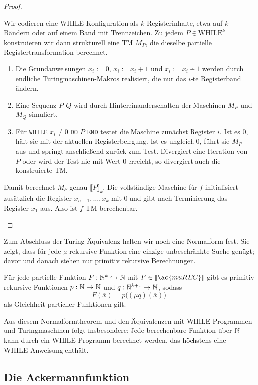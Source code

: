 \begin{proof}
\begin{itemize}
		Wir codieren eine WHILE-Konfiguration als $k$ Registerinhalte, etwa auf
		$k$ Bändern oder auf einem Band mit Trennzeichen. Zu jedem
		$P\in\mathrm{WHILE}^k$ konstruieren wir dann strukturell eine \ac{TM}
		$M_P$, die dieselbe partielle Registertransformation berechnet.
		\begin{enumerate}
		\item Die Grundanweisungen
			$x_i:=0$, $x_i:=x_i+1$ und $x_i:=x_i\dotminus1$ werden durch endliche
			Turingmaschinen-Makros realisiert, die nur das $i$-te Registerband
			ändern.
		\item Eine Sequenz $P;Q$ wird durch Hintereinanderschalten der Maschinen
			$M_P$ und $M_Q$ simuliert.
		\item Für
			$\texttt{WHILE }x_i\ne0\texttt{ DO }P\texttt{ END}$ testet die Maschine
			zunächst Register $i$. Ist es $0$, hält sie mit der aktuellen
			Registerbelegung. Ist es ungleich $0$, führt sie $M_P$ aus und springt
			anschließend zurück zum Test. Divergiert eine Iteration von $P$ oder
			wird der Test nie mit Wert $0$ erreicht, so divergiert auch die
			konstruierte \ac{TM}.
		\end{enumerate}
		Damit berechnet $M_P$ genau $\llbracket P\rrbracket_k$. Die vollständige
		Maschine für $f$ initialisiert zusätzlich die Register
		$x_{n+1},\dots,x_k$ mit $0$ und gibt nach Terminierung das Register $x_1$
		aus. Also ist $f$ \ac{TM}-berechenbar. \qedhere
	\end{itemize}
\end{proof}

Zum Abschluss der Turing-Äquivalenz halten wir noch eine Normalform fest. Sie
zeigt, dass für jede $\mu$-rekursive Funktion eine einzige unbeschränkte Suche
genügt; davor und danach stehen nur primitiv rekursive Berechnungen.
\begin{Satz}[name={Kleenes Normalformtheorem}]
	Für jede partielle Funktion $F:\mathbb{N}^k\hookrightarrow\mathbb{N}$ mit
	$F\in\llbracket\ac{muREC}\rrbracket$ gibt es primitiv rekursive Funktionen
	$p:\mathbb{N}\to\mathbb{N}$ und $q:\mathbb{N}^{k+1}\to\mathbb{N}$, sodass
	\[
		F(\overline{x})=p\bigl((\mu q)(\overline{x})\bigr)
	\]
	als Gleichheit partieller Funktionen gilt.
\end{Satz}

Aus diesem Normalformtheorem und den Äquivalenzen mit WHILE-Programmen und
Turingmaschinen folgt insbesondere: Jede berechenbare Funktion über $\mathbb{N}$ kann
durch ein WHILE-Programm berechnet werden, das höchstens eine WHILE-Anweisung
enthält.

\subsection{Die Ackermannfunktion}
\label{sec:die-ackerm}

